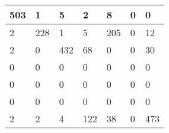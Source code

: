 \begin{tabular}{lllllll}
\hline
  503 & 1 & 5 & 2 & 8 & 0 & 0 \\
\hline
  2 & 228 & 1 & 5 & 205 & 0 & 12 \\
\hline
  2 & 0 & 432 & 68 & 0 & 0 & 30 \\
\hline
  0 & 0 & 0 & 0 & 0 & 0 & 0 \\
\hline
  0 & 0 & 0 & 0 & 0 & 0 & 0 \\
\hline
  0 & 0 & 0 & 0 & 0 & 0 & 0 \\
\hline
  2 & 2 & 4 & 122 & 38 & 0 & 473 \\
\hline
\end{tabular}
